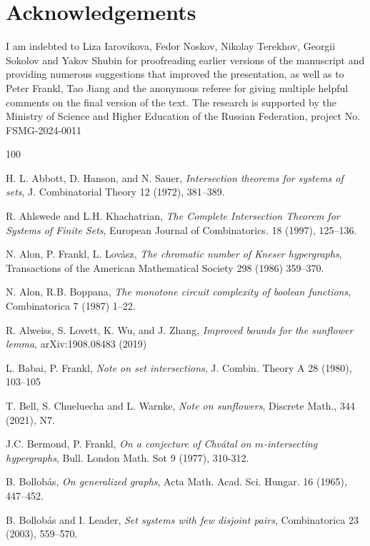 \documentclass[graybox]{svmult}
\begin{document}
\section{Acknowledgements} I am indebted to  Liza Iarovikova, Fedor Noskov, Nikolay Terekhov, Georgii Sokolov and Yakov Shubin for proofreading earlier versions of the manuscript and providing numerous suggestions that improved the presentation, as well as to Peter Frankl, Tao Jiang and the anonymous referee for giving multiple helpful comments on the final version of the text. The research is supported by the Ministry of Science and Higher Education of the Russian Federation, project No. FSMG-2024-0011






\begin{thebibliography}{100}


  H. L. Abbott, D. Hanson, and N. Sauer, {\it Intersection theorems for systems of sets}, J.
Combinatorial Theory 12 (1972), 381--389.


 R. Ahlswede and L.H. Khachatrian, {\it The Complete Intersection Theorem for Systems of Finite Sets}, European Journal of Combinatorics. 18 (1997), 125--136.

 N. Alon, P. Frankl, L. Lov\'asz, {\it The chromatic number of Kneser hypergraphs}, Transactions of the American Mathematical Society 298 (1986) 359--370.

 N. Alon, R.B. Boppana, {\it The monotone circuit complexity of boolean functions}, Combinatorica 7 (1987) 1--22.

 R. Alweiss, S. Lovett, K. Wu, and J. Zhang, {\it Improved bounds for the sunflower lemma}, arXiv:1908.08483 (2019)

 L. Babai, P. Frankl, {\it Note on set intersections}, J. Combin. Theory A 28 (1980), 103--105

 T. Bell, S. Chueluecha and L. Warnke, {\it Note on sunflowers}, Discrete Math., 344 (2021), N7.

 J.C. Bermond, P. Frankl, {\it On a conjecture of Chv\' atal on $m$-intersecting hypergraphs}, Bull. London Math. Sot 9 (1977), 310-312.

 B. Bollob\'as, {\it On generalized graphs}, Acta Math. Acad. Sci. Hungar. 16 (1965), 447--452.

 B. Bollob\'as and I. Leader, {\it Set systems with few disjoint pairs}, Combinatorica 23 (2003), 559--570.


\end{thebibliography}
\end{document}
